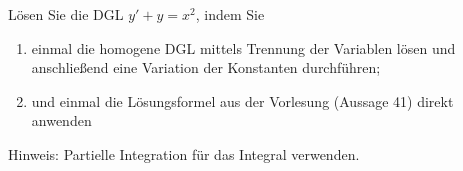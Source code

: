 \item Lösen Sie die DGL $y'+y=x^2$, indem Sie
\begin{enumerate}
	\item einmal die homogene DGL mittels Trennung der Variablen lösen und anschließend eine Variation der Konstanten durchführen;
	\item und einmal die Lösungsformel aus der Vorlesung (Aussage 41) direkt anwenden
\end{enumerate}
Hinweis: Partielle Integration für das Integral verwenden.
